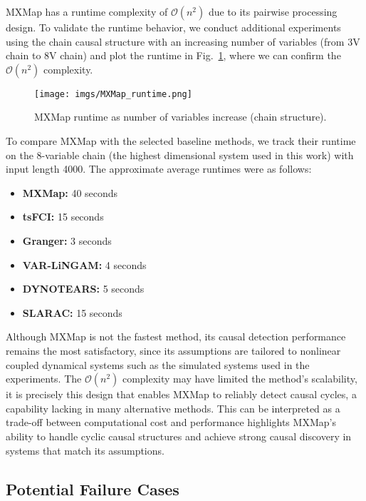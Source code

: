 MXMap has a runtime complexity of $\mathcal{O}(n^2)$ due to its pairwise processing design. To validate the runtime behavior, we conduct additional experiments using the chain causal structure with an increasing number of variables (from 3V chain to 8V chain) and plot the runtime in Fig.~\ref{appfig:mxmap_runtime}, where we can confirm the $\mathcal{O}(n^2)$ complexity.

\begin{figure}[htb]
    \centering
    \texttt{[image: imgs/MXMap\_runtime.png]}
    \caption{MXMap runtime as number of variables increase (chain structure).}
    \label{appfig:mxmap_runtime}
\end{figure}

To compare MXMap with the selected baseline methods, we track their runtime on the 8-variable chain (the highest dimensional system used in this work) with input length 4000. The approximate average runtimes were as follows:
\begin{itemize}
    \item \textbf{MXMap:} 40 seconds
    \item \textbf{tsFCI:} 15 seconds
    \item \textbf{Granger:} 3 seconds
    \item \textbf{VAR-LiNGAM:} 4 seconds
    \item \textbf{DYNOTEARS:} 5 seconds
    \item \textbf{SLARAC:} 15 seconds
\end{itemize}

Although MXMap is not the fastest method, its causal detection performance remains the most satisfactory, since its assumptions are tailored to nonlinear coupled dynamical systems such as the simulated systems used in the experiments. The $\mathcal{O}(n^2)$ complexity may have limited the method's scalability, it is precisely this design that enables MXMap to reliably detect causal cycles, a capability lacking in many alternative methods. This can be interpreted as a trade-off between computational cost and performance highlights MXMap’s ability to handle cyclic causal structures and achieve strong causal discovery in systems that match its assumptions.

\subsection{Potential Failure Cases}


